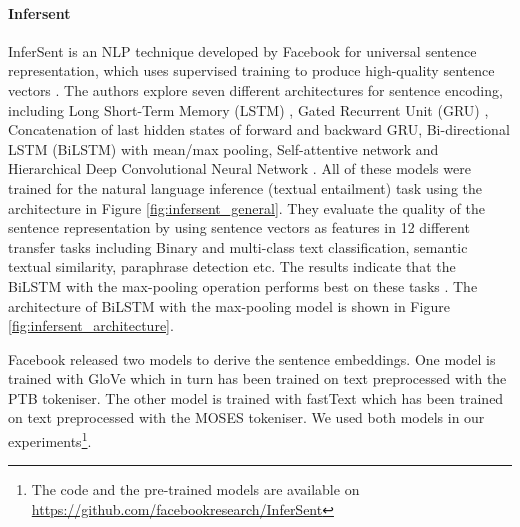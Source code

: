 \paragraph{Infersent}
InferSent is an NLP technique developed by Facebook for universal sentence representation, which uses supervised training to produce high-quality sentence vectors \autocite{conneau-EtAl:2017:EMNLP2017}. The authors explore seven different architectures for sentence
encoding, including Long Short-Term Memory (LSTM) \autocite{10.1162/neco.1997.9.8.1735}, Gated Recurrent Unit (GRU) \autocite{Chung2014EmpiricalEO}, Concatenation of last hidden states of forward and backward GRU, Bi-directional LSTM (BiLSTM) \autocite{650093} with mean/max pooling, Self-attentive network and Hierarchical Deep Convolutional Neural Network \autocite{conneau-EtAl:2017:EMNLP2017}. All of these models were trained for the natural language inference (textual entailment) task using the architecture in Figure \ref{fig:infersent_general}. They evaluate the quality of the sentence representation by using sentence vectors as features in 12 different transfer tasks including Binary and multi-class text classification, semantic textual similarity, paraphrase detection etc. The results indicate that the BiLSTM with the max-pooling operation performs best on these tasks  \autocite{conneau-EtAl:2017:EMNLP2017}. The architecture of BiLSTM with the max-pooling model is shown in Figure \ref{fig:infersent_architecture}.

Facebook released two models to derive the sentence embeddings. One model is trained with GloVe \autocite{pennington-etal-2014-glove} which in turn has been trained on text preprocessed with the PTB tokeniser. The other model is trained with fastText \autocite{mikolov-etal-2018-advances}  which has been trained on text preprocessed with the MOSES tokeniser. We used both models in our experiments\footnote{The code and the pre-trained models are available on \url{https://github.com/facebookresearch/InferSent}}.



